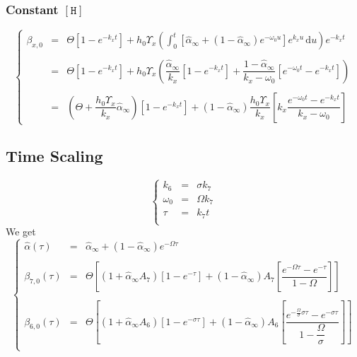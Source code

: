 \documentclass[aps,onecolumn,12pt]{revtex4}
\newcommand{\mychem}[1]{\mathtt{#1}}
\newcommand{\myconc}[1]{\left\lbrack{#1}\right\rbrack}
\newcommand{\spproton}{\mychem{H}}
\newcommand{\proton}{\myconc{\spproton}}
\begin{document}
\subsubsection{Constant $\proton$}
\begin{equation}
\left\lbrace
\begin{array}{rcl}
\beta_{x,0} & = & \displaystyle \Theta \left[1-e^{-k_xt}\right] +h_0 \Upsilon_x
\left( \int_0^t \left[\hat\alpha_\infty + \left(1-\hat\alpha_\infty\right) e^{-\omega_0 u} \right]e^{k_xu} \,\mathrm{d}u \right) e^{-k_x t} \\
\\
& = & \displaystyle \Theta \left[1-e^{-k_xt}\right] +
h_0 \Upsilon_x 
	\left( 
		\dfrac{\hat\alpha_\infty}{k_x}\left[1-e^{-k_xt}\right]  
		+ \dfrac{1-\hat\alpha_\infty}{k_x - \omega_0}\left[e^{-\omega_0t} - e^{-k_xt}\right]
	\right)\\
\\
& = & \left(\Theta+\dfrac{h_0\Upsilon_x}{k_x} \hat{\alpha}_\infty\right) \left[1-e^{-k_xt}\right] + (1-\hat\alpha_\infty) \dfrac{h_0\Upsilon_x}{k_x} \left[ k_x \dfrac{e^{-\omega_0t} - e^{-k_xt}}{k_x - \omega_0}\right]
\end{array}
\right.
\end{equation}


\subsection{Time Scaling}
\begin{equation}
\left\lbrace
\begin{array}{rcl}
	k_6      & = & \sigma k_7\\
	\omega_0 & = & \Omega k_7\\
	\tau     & = & k_7 t\\
\end{array}
\right.
\end{equation}
We get
\begin{equation}
\left\lbrace
\begin{array}{rcl}
	\hat\alpha(\tau)  & = & \hat\alpha_\infty + \left(1-\hat\alpha_\infty\right) e^{-\Omega \tau}\\
	\\
	\beta_{7,0}(\tau) & = & \Theta\left[ \left( 1 + \hat\alpha_\infty A_7 \right)  \left[1-e^{-\tau}\right]
	+ \left(1-\hat\alpha_\infty\right) A_7 \left[\dfrac{e^{-\Omega\tau} - e^{-\tau}}{1-\Omega}\right] \right]\\
	\\
	\beta_{6,0}(\tau) & = & \Theta\left[ \left( 1 + \hat\alpha_\infty A_6 \right)  \left[1-e^{-\sigma\tau}\right]
	+ \left(1-\hat\alpha_\infty\right) A_6 \left[\dfrac{e^{-\frac{\Omega}{\sigma}\sigma\tau} - e^{-\sigma\tau}}{1-\dfrac{\Omega}{\sigma}}\right]\right]\\
\end{array}
\right.
\end{equation}
\end{document}
